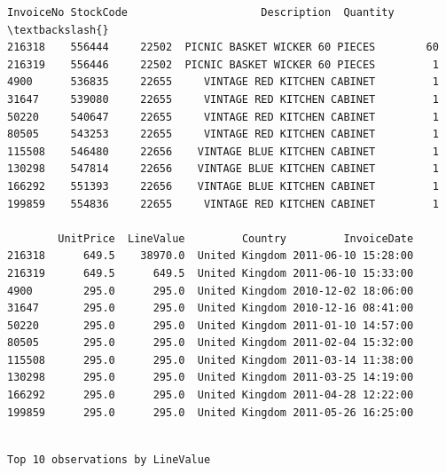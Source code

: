 \documentclass[11pt]{article}
\begin{document}
    
    \begin{Verbatim}[commandchars=\\\{\}]
       InvoiceNo StockCode                     Description  Quantity  \textbackslash{}
216318    556444     22502  PICNIC BASKET WICKER 60 PIECES        60   
216319    556446     22502  PICNIC BASKET WICKER 60 PIECES         1   
4900      536835     22655     VINTAGE RED KITCHEN CABINET         1   
31647     539080     22655     VINTAGE RED KITCHEN CABINET         1   
50220     540647     22655     VINTAGE RED KITCHEN CABINET         1   
80505     543253     22655     VINTAGE RED KITCHEN CABINET         1   
115508    546480     22656    VINTAGE BLUE KITCHEN CABINET         1   
130298    547814     22656    VINTAGE BLUE KITCHEN CABINET         1   
166292    551393     22656    VINTAGE BLUE KITCHEN CABINET         1   
199859    554836     22655     VINTAGE RED KITCHEN CABINET         1   

        UnitPrice  LineValue         Country         InvoiceDate  
216318      649.5    38970.0  United Kingdom 2011-06-10 15:28:00  
216319      649.5      649.5  United Kingdom 2011-06-10 15:33:00  
4900        295.0      295.0  United Kingdom 2010-12-02 18:06:00  
31647       295.0      295.0  United Kingdom 2010-12-16 08:41:00  
50220       295.0      295.0  United Kingdom 2011-01-10 14:57:00  
80505       295.0      295.0  United Kingdom 2011-02-04 15:32:00  
115508      295.0      295.0  United Kingdom 2011-03-14 11:38:00  
130298      295.0      295.0  United Kingdom 2011-03-25 14:19:00  
166292      295.0      295.0  United Kingdom 2011-04-28 12:22:00  
199859      295.0      295.0  United Kingdom 2011-05-26 16:25:00  
    \end{Verbatim}

    
    \begin{Verbatim}[commandchars=\\\{\}]

Top 10 observations by LineValue
    \end{Verbatim}
\end{document}
